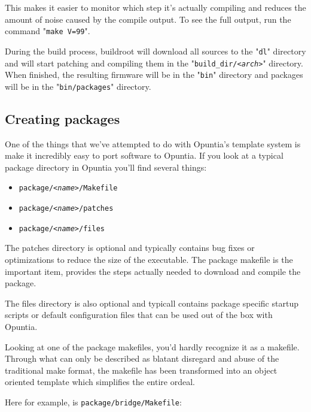 This makes it easier to monitor which step it's actually compiling and reduces the amount
of noise caused by the compile output. To see the full output, run the command
"\texttt{make V=99}".

During the build process, buildroot will download all sources to the "\texttt{dl}"
directory and will start patching and compiling them in the "\texttt{build\_dir/\textit{<arch>}}"
directory. When finished, the resulting firmware will be in the "\texttt{bin}" directory
and packages will be in the "\texttt{bin/packages}" directory.


\subsection{Creating packages}

One of the things that we've attempted to do with Opuntia's template system is make it
incredibly easy to port software to Opuntia. If you look at a typical package directory
in Opuntia you'll find several things:

\begin{itemize}
    \item \texttt{package/\textit{<name>}/Makefile}
    \item \texttt{package/\textit{<name>}/patches}
    \item \texttt{package/\textit{<name>}/files}
\end{itemize}

The patches directory is optional and typically contains bug fixes or optimizations to
reduce the size of the executable. The package makefile is the important item, provides
the steps actually needed to download and compile the package.

The files directory is also optional and typicall contains package specific startup scripts or default configuration files that can be used out of the box with Opuntia.

Looking at one of the package makefiles, you'd hardly recognize it as a makefile.
Through what can only be described as blatant disregard and abuse of the traditional
make format, the makefile has been transformed into an object oriented template which
simplifies the entire ordeal.

Here for example, is \texttt{package/bridge/Makefile}:

